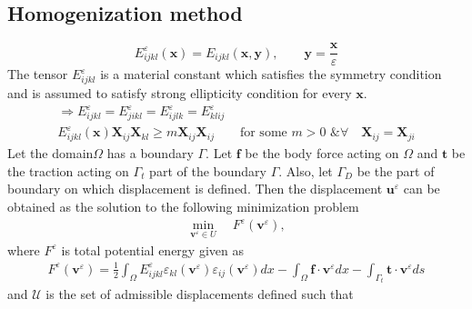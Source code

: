 \documentclass[10pt]{article}
\begin{document}
\subsection{Homogenization method}
\begin{equation}
E_{ijkl}^\varepsilon (\textbf{x}) = E_{ijkl}(\textbf{x},\textbf{y}), \qquad \textbf{y} = \frac{\textbf{x}}{\varepsilon}
\end{equation}
The tensor $E_{ijkl}^\varepsilon$ is a material constant which satisfies the symmetry condition and is assumed to satisfy strong ellipticity condition for every $\textbf{x}$.
\begin{gather}
\Rightarrow E_{ijkl}^\varepsilon =E_{jikl}^\varepsilon =E_{ijlk}^\varepsilon =E_{klij}^\varepsilon\\
E_{ijkl}^\varepsilon(\textbf{x})\textbf{X}_{ij}\textbf{X}_{kl}\geq m\textbf{X}_{ij}\textbf{X}_{ij} \qquad \text{for some } m>0 \text{ \& } \forall \quad \textbf{X}_{ij}=\textbf{X}_{ji}
\end{gather}
Let the domain$\Omega$ has a boundary $\Gamma$. Let $\textbf{f}$ be the body force acting on $\Omega$ and $\textbf{t}$ be the traction acting on $\Gamma_t$ part of the boundary $\Gamma$. Also, let $\Gamma_D$ be the part of boundary on which displacement is defined. Then the displacement $\textbf{u}^\varepsilon$ can be obtained as the solution to the following minimization problem
\begin{align}
\label{fem}
\min_{\textbf{v}^\varepsilon\in U} \quad F^\varepsilon(\textbf{v}^\varepsilon),
\end{align} 
where $F^\varepsilon$ is total potential energy given as	
\begin{eqnarray} \label{tpe}
F^\varepsilon(\textbf{v}^\varepsilon) = \frac{1}{2}\int_\Omega E^\varepsilon_{ijkl}\varepsilon_{kl}(\textbf{v}^\varepsilon)\varepsilon_{ij}(\textbf{v}^\varepsilon)dx-\int_\Omega\textbf{f}\cdot\textbf{v}^\varepsilon dx - \int_{\Gamma_t}\textbf{t}\cdot\textbf{v}^\varepsilon ds
\end{eqnarray}
and $\mathcal{U}$ is the set of admissible displacements defined such that
\end{document}

